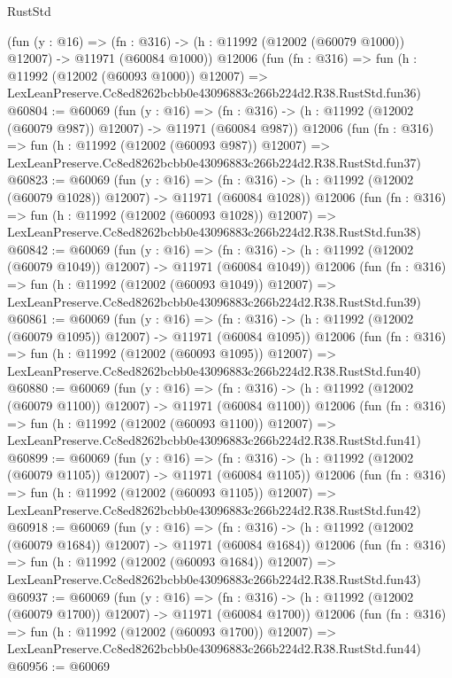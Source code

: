 \begin{lexlean}{RustStd}
\begin{coremodule}
    (fun (y : @16) =>
    (fn : @316) -> (h : @11992 (@12002 (@60079 @1000)) @12007) -> @11971 (@60084 @1000))
    @12006
    (fun (fn : @316) =>
    fun (h : @11992 (@12002 (@60093 @1000)) @12007) =>
    LexLeanPreserve.Cc8ed8262bcbb0e43096883c266b224d2.R38.RustStd.fun36)
@60804 := @60069
    (fun (y : @16) =>
    (fn : @316) -> (h : @11992 (@12002 (@60079 @987)) @12007) -> @11971 (@60084 @987))
    @12006
    (fun (fn : @316) =>
    fun (h : @11992 (@12002 (@60093 @987)) @12007) =>
    LexLeanPreserve.Cc8ed8262bcbb0e43096883c266b224d2.R38.RustStd.fun37)
@60823 := @60069
    (fun (y : @16) =>
    (fn : @316) -> (h : @11992 (@12002 (@60079 @1028)) @12007) -> @11971 (@60084 @1028))
    @12006
    (fun (fn : @316) =>
    fun (h : @11992 (@12002 (@60093 @1028)) @12007) =>
    LexLeanPreserve.Cc8ed8262bcbb0e43096883c266b224d2.R38.RustStd.fun38)
@60842 := @60069
    (fun (y : @16) =>
    (fn : @316) -> (h : @11992 (@12002 (@60079 @1049)) @12007) -> @11971 (@60084 @1049))
    @12006
    (fun (fn : @316) =>
    fun (h : @11992 (@12002 (@60093 @1049)) @12007) =>
    LexLeanPreserve.Cc8ed8262bcbb0e43096883c266b224d2.R38.RustStd.fun39)
@60861 := @60069
    (fun (y : @16) =>
    (fn : @316) -> (h : @11992 (@12002 (@60079 @1095)) @12007) -> @11971 (@60084 @1095))
    @12006
    (fun (fn : @316) =>
    fun (h : @11992 (@12002 (@60093 @1095)) @12007) =>
    LexLeanPreserve.Cc8ed8262bcbb0e43096883c266b224d2.R38.RustStd.fun40)
@60880 := @60069
    (fun (y : @16) =>
    (fn : @316) -> (h : @11992 (@12002 (@60079 @1100)) @12007) -> @11971 (@60084 @1100))
    @12006
    (fun (fn : @316) =>
    fun (h : @11992 (@12002 (@60093 @1100)) @12007) =>
    LexLeanPreserve.Cc8ed8262bcbb0e43096883c266b224d2.R38.RustStd.fun41)
@60899 := @60069
    (fun (y : @16) =>
    (fn : @316) -> (h : @11992 (@12002 (@60079 @1105)) @12007) -> @11971 (@60084 @1105))
    @12006
    (fun (fn : @316) =>
    fun (h : @11992 (@12002 (@60093 @1105)) @12007) =>
    LexLeanPreserve.Cc8ed8262bcbb0e43096883c266b224d2.R38.RustStd.fun42)
@60918 := @60069
    (fun (y : @16) =>
    (fn : @316) -> (h : @11992 (@12002 (@60079 @1684)) @12007) -> @11971 (@60084 @1684))
    @12006
    (fun (fn : @316) =>
    fun (h : @11992 (@12002 (@60093 @1684)) @12007) =>
    LexLeanPreserve.Cc8ed8262bcbb0e43096883c266b224d2.R38.RustStd.fun43)
@60937 := @60069
    (fun (y : @16) =>
    (fn : @316) -> (h : @11992 (@12002 (@60079 @1700)) @12007) -> @11971 (@60084 @1700))
    @12006
    (fun (fn : @316) =>
    fun (h : @11992 (@12002 (@60093 @1700)) @12007) =>
    LexLeanPreserve.Cc8ed8262bcbb0e43096883c266b224d2.R38.RustStd.fun44)
@60956 := @60069

\end{coremodule}
\end{lexlean}
